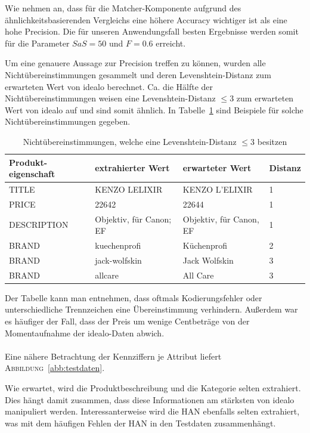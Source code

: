 Wie nehmen an, dass für die Matcher-Komponente aufgrund des ähnlichkeitsbasierenden Vergleichs eine höhere Accuracy
wichtiger ist als eine hohe Precision.
Die für unseren Anwendungsfall besten Ergebnisse werden somit für die Parameter $SaS = 50$ und $F = 0.6$ erreicht.

\newpage
Um eine genauere Aussage zur Precision treffen zu können, wurden alle Nichtübereinstimmungen gesammelt und deren
Levenshtein-Distanz zum erwarteten Wert von idealo berechnet.
Ca. die Hälfte der Nichtübereinstimmungen weisen eine Levenshtein-Distanz $\leq 3$ zum erwarteten Wert von idealo
auf und sind somit ähnlich.
In Tabelle~\ref{tab:levenshtein-examples} sind Beispiele für solche Nichtübereinstimmungen gegeben.

\begin{table}[h]
    \centering
    \begin{tabular}{ p{2.5cm} | p{5cm} | p{5cm} | p{1cm}}
        \textbf{Produkt-eigenschaft} & \textbf{extrahierter Wert} & \textbf{erwarteter Wert} &
        \textbf{Distanz} \\
        \hline
        TITLE & KENZO LELIXIR & KENZO L'ELIXIR & 1\\
        PRICE & 22642 & 22644 & 1\\
        DESCRIPTION & Objektiv, für Canon; EF	& Objektiv, für Canon, EF & 1\\
        BRAND &	kuechenprofi & Küchenprofi & 2\\
        BRAND & jack-wolfskin & Jack Wolfskin & 3\\
        BRAND & allcare & All Care & 3
    \end{tabular}
    \caption{Nichtübereinstimmungen, welche eine Levenshtein-Distanz $\leq 3$ besitzen}
    \label{tab:levenshtein-examples}
    \vspace{-0.25cm}
\end{table}

Der Tabelle kann man entnehmen, dass oftmals Kodierungsfehler oder unterschiedliche Trennzeichen eine
Übereinstimmung verhindern.
Außerdem war es häufiger der Fall, dass der Preis um wenige Centbeträge von der Momentaufnahme der idealo-Daten
abwich.
\\
~\\
Eine nähere Betrachtung der Kennziffern je Attribut liefert \textsc{Abbildung}~\ref{abb:testdaten}.

Wie erwartet, wird die Produktbeschreibung und die Kategorie selten extrahiert.
Dies hängt damit zusammen, dass diese Informationen am stärksten von idealo manipuliert werden.
Interessanterweise wird die HAN ebenfalls selten extrahiert, was mit dem häufigen Fehlen der HAN in den
Testdaten zusammenhängt.

